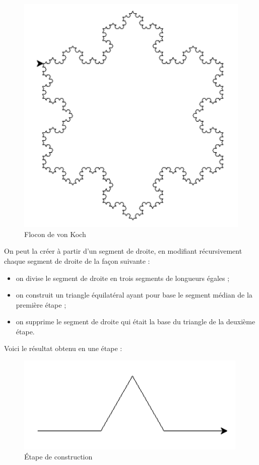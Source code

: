 \documentclass[
  a4paper,
  DIV=11,
  numbers=noendperiod]{scrartcl}
\providecommand{\tightlist}{%
  \setlength{\itemsep}{0pt}\setlength{\parskip}{0pt}}\usepackage{longtable,booktabs,array}
\begin{document}
\begin{figure}

{\centering \includegraphics{koch.png}

}

\caption{Flocon de von Koch}

\end{figure}

On peut la créer à partir d'un segment de droite, en modifiant
récursivement chaque segment de droite de la façon suivante :

\begin{itemize}
\tightlist
\item
  on divise le segment de droite en trois segments de longueurs égales ;
\item
  on construit un triangle équilatéral ayant pour base le segment médian
  de la première étape ;
\item
  on supprime le segment de droite qui était la base du triangle de la
  deuxième étape.
\end{itemize}

Voici le résultat obtenu en une étape :

\begin{figure}

{\centering \includegraphics{koch_etape.png}

}

\caption{Étape de construction}

\end{figure}
\end{document}
